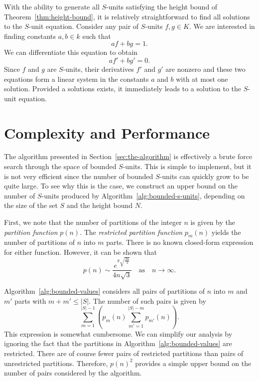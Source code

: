 With the ability to generate all \(S\)-units satisfying the height bound of Theorem~\ref{thm:height-bound}, it is relatively straightforward to find all solutions to the \(S\)-unit equation. Consider any pair of \(S\)-units \(f, g \in K\). We are interested in finding constants \(a, b \in k\) such that
\[af + bg = 1.\]
We can differentiate this equation to obtain
\[af' + bg' = 0.\]
Since \(f\) and \(g\) are \(S\)-units, their derivatives \(f'\) and \(g'\) are nonzero and these two equations form a linear system in the constants \(a\) and \(b\) with at most one solution. Provided a solutions exists, it immediately leads to a solution to the \(S\)-unit equation.

\section{Complexity and Performance}%
\label{sec:complexity-and-performance}

The algorithm presented in Section~\ref{sec:the-algorithm} is effectively a brute force search through the space of bounded \(S\)-units. This is simple to implement, but it is not very efficient since the number of bounded \(S\)-units can quickly grow to be quite large. To see why this is the case, we construct an upper bound on the number of \(S\)-units produced by Algorithm~\ref{alg:bounded-s-units}, depending on the size of the set \(S\) and the height bound \(N\).

First, we note that the number of partitions of the integer \(n\) is given by the \textit{partition function} \(p(n)\). The \textit{restricted partition function} \(p_{m}(n)\) yields the number of partitions of \(n\) into \(m\) parts. There is no known closed-form expression for either function. However, it can be shown that
\[p(n) \sim \frac{e^{\pi\sqrt{\frac{2n}{3}}}}{4n\sqrt{3}} \quad \text{as} \quad n \to \infty.\]

Algorithm~\ref{alg:bounded-values} considers all pairs of partitions  of \(n\) into \(m\) and \(m'\) parts with \(m + m' \leq |S|\). The number of such pairs is given by
\[\sum_{m = 1}^{|S| - 1} \left( p_{m}(n) \sum_{m' = 1}^{|S| - m} p_{m'}(n) \right).\]
This expression is somewhat cumbersome. We can simplify our analysis by ignoring the fact that the partitions in Algorithm~\ref{alg:bounded-values} are restricted. There are of course fewer pairs of restricted partitions than pairs of unrestricted partitions. Therefore, \({p(n)}^{2}\) provides a simple upper bound on the number of pairs considered by the algorithm.


